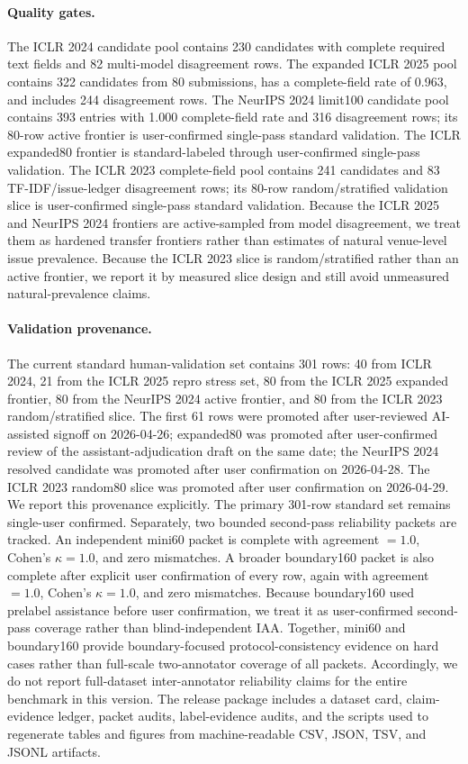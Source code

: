 \paragraph{Quality gates.}
The ICLR 2024 candidate pool contains 230 candidates with complete required text fields and 82 multi-model disagreement rows.
The expanded ICLR 2025 pool contains 322 candidates from 80 submissions, has a complete-field rate of 0.963, and includes 244 disagreement rows.
The NeurIPS 2024 limit100 candidate pool contains 393 entries with 1.000 complete-field rate and 316 disagreement rows; its 80-row active frontier is user-confirmed single-pass standard validation.
The ICLR expanded80 frontier is standard-labeled through user-confirmed single-pass validation.
The ICLR 2023 complete-field pool contains 241 candidates and 83 TF-IDF/issue-ledger disagreement rows; its 80-row random/stratified validation slice is user-confirmed single-pass standard validation.
Because the ICLR 2025 and NeurIPS 2024 frontiers are active-sampled from model disagreement, we treat them as hardened transfer frontiers rather than estimates of natural venue-level issue prevalence.
Because the ICLR 2023 slice is random/stratified rather than an active frontier, we report it by measured slice design and still avoid unmeasured natural-prevalence claims.

\paragraph{Validation provenance.}
The current standard human-validation set contains 301 rows: 40 from ICLR 2024, 21 from the ICLR 2025 repro stress set, 80 from the ICLR 2025 expanded frontier, 80 from the NeurIPS 2024 active frontier, and 80 from the ICLR 2023 random/stratified slice.
The first 61 rows were promoted after user-reviewed AI-assisted signoff on 2026-04-26; expanded80 was promoted after user-confirmed review of the assistant-adjudication draft on the same date; the NeurIPS 2024 resolved candidate was promoted after user confirmation on 2026-04-28.
The ICLR 2023 random80 slice was promoted after user confirmation on 2026-04-29.
We report this provenance explicitly.
The primary 301-row standard set remains single-user confirmed.
Separately, two bounded second-pass reliability packets are tracked.
An independent mini60 packet is complete with agreement $=1.0$, Cohen's $\kappa=1.0$, and zero mismatches.
A broader boundary160 packet is also complete after explicit user confirmation of every row, again with agreement $=1.0$, Cohen's $\kappa=1.0$, and zero mismatches.
Because boundary160 used prelabel assistance before user confirmation, we treat it as user-confirmed second-pass coverage rather than blind-independent IAA.
Together, mini60 and boundary160 provide boundary-focused protocol-consistency evidence on hard cases rather than full-scale two-annotator coverage of all packets.
Accordingly, we do not report full-dataset inter-annotator reliability claims for the entire benchmark in this version.
The release package includes a dataset card, claim-evidence ledger, packet audits, label-evidence audits, and the scripts used to regenerate tables and figures from machine-readable CSV, JSON, TSV, and JSONL artifacts.

